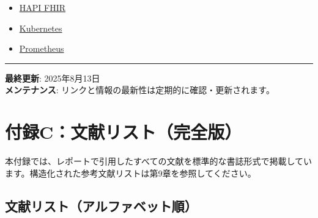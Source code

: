\documentclass[
  a4paper,
  a4paper,
  11pt]{ltjsbook}
\providecommand{\tightlist}{%
  \setlength{\itemsep}{0pt}\setlength{\parskip}{0pt}}
\begin{document}
\begin{itemize}
\tightlist
\item
  \href{https://hapifhir.io/}{HAPI FHIR}
\item
  \href{https://kubernetes.io/}{Kubernetes}
\item
  \href{https://prometheus.io/}{Prometheus}
\end{itemize}

\begin{center}\rule{0.5\linewidth}{0.5pt}\end{center}

\textbf{最終更新}: 2025年8月13日\\
\textbf{メンテナンス}:
リンクと情報の最新性は定期的に確認・更新されます。

\chapter{付録C：文献リスト（完全版）}\label{ux4ed8ux9332cux6587ux732eux30eaux30b9ux30c8ux5b8cux5168ux7248}

本付録では、レポートで引用したすべての文献を標準的な書誌形式で掲載しています。構造化された参考文献リストは第9章を参照してください。

\section{文献リスト（アルファベット順）}\label{ux6587ux732eux30eaux30b9ux30c8ux30a2ux30ebux30d5ux30a1ux30d9ux30c3ux30c8ux9806}
\end{document}

